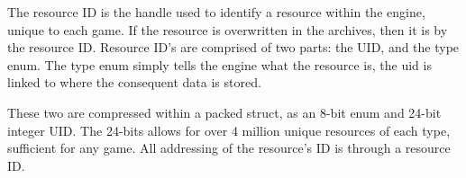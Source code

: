 The resource ID is the handle used to identify a resource within the engine, unique to each game. If the resource is overwritten in the archives, then it is by the resource ID. Resource ID's are comprised of two parts: the UID, and the type enum. The type enum simply tells the engine what the resource is, the uid is linked to where the consequent data is stored.

These two are compressed within a packed struct, as an 8-bit enum and 24-bit integer UID. The 24-bits allows for over 4 million unique resources of each type, sufficient for any game. All addressing of the resource's ID is through a resource ID.